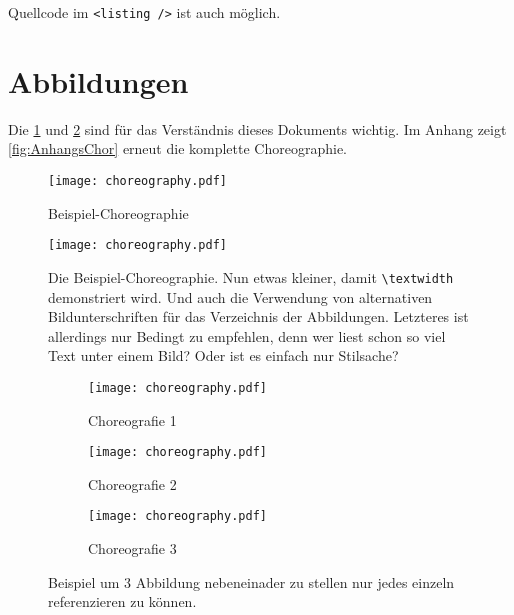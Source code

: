 Quellcode im \lstinline|<listing />| ist auch möglich.

\section{Abbildungen}

Die \cref{fig:chor1} und \ref{fig:chor2} sind für das Verständnis dieses Dokuments wichtig.
Im Anhang zeigt \vref{fig:AnhangsChor} erneut die komplette Choreographie.

\begin{figure}
  \centering
  \texttt{[image: choreography.pdf]}
  \caption{Beispiel-Choreographie}
  \label{fig:chor1}
\end{figure}

\begin{figure}
  \centering
  \texttt{[image: choreography.pdf]}
  \caption[Beispiel-Choreographie]{Die Beispiel-Choreographie. Nun etwas kleiner, damit \texttt{\textbackslash textwidth} demonstriert wird. Und auch die Verwendung von alternativen Bildunterschriften für das Verzeichnis der Abbildungen. Letzteres ist allerdings nur Bedingt zu empfehlen, denn wer liest schon so viel Text unter einem Bild? Oder ist es einfach nur Stilsache?}
  \label{fig:chor2}
\end{figure}


\begin{figure}
  \hfill
  \begin{subfigure}{.3\textwidth}
    \texttt{[image: choreography.pdf]}
    \caption{Choreografie 1}
    \label{fig:subfigA}
  \end{subfigure}
  \hfill
  \begin{subfigure}{.3\textwidth}
    \texttt{[image: choreography.pdf]}
    \caption{Choreografie 2}
    \label{fig:subfigB}
  \end{subfigure}
  \hfill
  \begin{subfigure}{.3\textwidth}
    \texttt{[image: choreography.pdf]}
    \caption{Choreografie 3}
    \label{fig:subfigC}
  \end{subfigure}
  \caption{Beispiel um 3 Abbildung nebeneinader zu stellen nur jedes einzeln referenzieren zu können.}
  \label{fig:subfig_example}
\end{figure}

